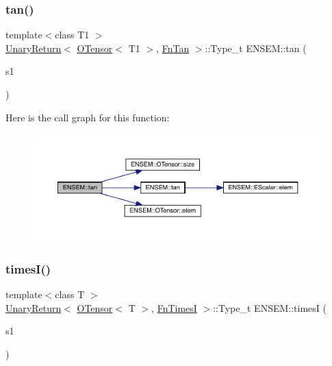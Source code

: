 \subsubsection{\texorpdfstring{tan()}{tan()}}
{\footnotesize\ttfamily template$<$class T1 $>$ \\
\mbox{\hyperlink{structENSEM_1_1UnaryReturn}{Unary\+Return}}$<$ \mbox{\hyperlink{classENSEM_1_1OTensor}{O\+Tensor}}$<$ T1 $>$, \mbox{\hyperlink{structENSEM_1_1FnTan}{Fn\+Tan}} $>$\+::Type\+\_\+t E\+N\+S\+E\+M\+::tan (\begin{DoxyParamCaption}\item[{const \mbox{\hyperlink{classENSEM_1_1OTensor}{O\+Tensor}}$<$ T1 $>$ \&}]{s1 }\end{DoxyParamCaption})\hspace{0.3cm}{\ttfamily [inline]}}

Here is the call graph for this function\+:\nopagebreak
\begin{figure}[H]
\begin{center}
\leavevmode
\includegraphics[width=350pt]{de/d87/group__obstensor_gaaea33431d7f292c563a371d23c31eb07_cgraph}
\end{center}
\end{figure}
\mbox{\label{group__obstensor_ga014bfcb56266f5301dcc8a1fe479f8b1}} 
\subsubsection{\texorpdfstring{timesI()}{timesI()}}
{\footnotesize\ttfamily template$<$class T $>$ \\
\mbox{\hyperlink{structENSEM_1_1UnaryReturn}{Unary\+Return}}$<$ \mbox{\hyperlink{classENSEM_1_1OTensor}{O\+Tensor}}$<$ T $>$, \mbox{\hyperlink{structENSEM_1_1FnTimesI}{Fn\+TimesI}} $>$\+::Type\+\_\+t E\+N\+S\+E\+M\+::timesI (\begin{DoxyParamCaption}\item[{const \mbox{\hyperlink{classENSEM_1_1OTensor}{O\+Tensor}}$<$ T $>$ \&}]{s1 }\end{DoxyParamCaption})\hspace{0.3cm}{\ttfamily [inline]}}



